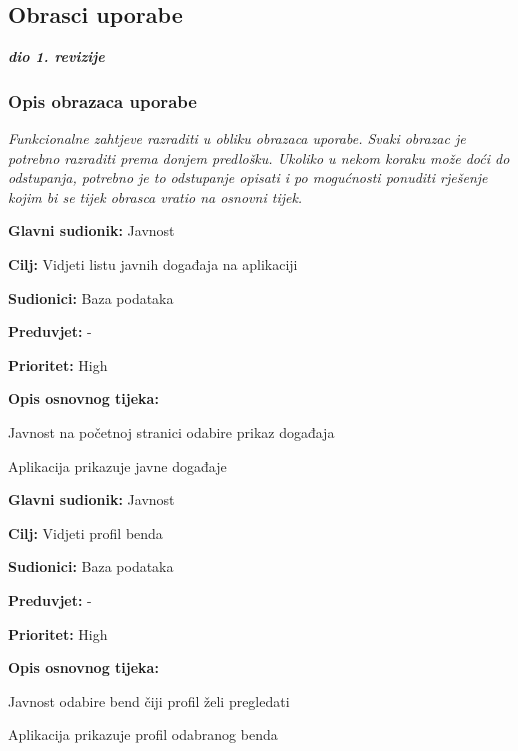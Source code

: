 \eject 
			
			
				
\subsection{Obrasci uporabe}

\textbf{\textit{dio 1. revizije}}

\subsubsection{Opis obrazaca uporabe}
	\textit{Funkcionalne zahtjeve razraditi u obliku obrazaca uporabe. Svaki obrazac je potrebno razraditi prema donjem predlošku. Ukoliko u nekom koraku može doći do odstupanja, potrebno je to odstupanje opisati i po mogućnosti ponuditi rješenje kojim bi se tijek obrasca vratio na osnovni tijek.}\\


\noindent {}
	\begin{packed_item}
		
		\item \textbf{Glavni sudionik: } Javnost
		\item  \textbf{Cilj:} Vidjeti listu javnih događaja na aplikaciji
		\item  \textbf{Sudionici:} Baza podataka
		\item  \textbf{Preduvjet:} -
		\item  \textbf{Prioritet:} High
		\item  \textbf{Opis osnovnog tijeka:}
		
		\item[] \begin{packed_enum}
			\item Javnost na početnoj stranici odabire prikaz događaja
			\item Aplikacija prikazuje javne događaje
		\end{packed_enum}
		
	\end{packed_item}


\noindent {}
	\begin{packed_item}
	
		\item \textbf{Glavni sudionik:} Javnost
		\item  \textbf{Cilj:} Vidjeti profil benda
		\item  \textbf{Sudionici:} Baza podataka
		\item  \textbf{Preduvjet:} -
		\item  \textbf{Prioritet:} High
		\item  \textbf{Opis osnovnog tijeka:}
		
		\item[] \begin{packed_enum}
			\item Javnost odabire bend čiji profil želi pregledati
			\item Aplikacija prikazuje profil odabranog benda
		\end{packed_enum}
	\end{packed_item}

